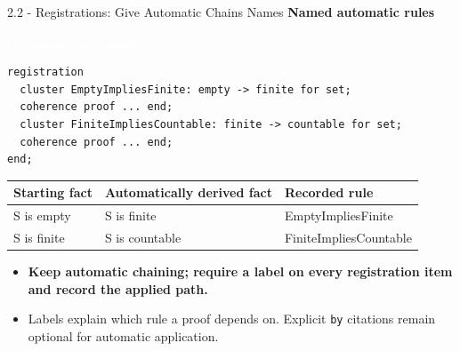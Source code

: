 \documentclass[aspectratio=169,11pt]{beamer}
\newcommand{\statusbadge}[2]{\colorbox{#1}{\textcolor{white}{\strut\scriptsize\sffamily\bfseries #2}}}
\newcommand{\badgeSpec}{\statusbadge{green!35!black}{specification example}}
\begin{document}
\begin{frame}[fragile,t]{2.2 - Registrations: Give Automatic Chains Names}
\smallskip
\textbf{Named automatic rules}~\badgeSpec
\begin{lstlisting}[language={mizar},basicstyle=\ttfamily\small]
registration
  cluster EmptyImpliesFinite: empty -> finite for set;
  coherence proof ... end;
  cluster FiniteImpliesCountable: finite -> countable for set;
  coherence proof ... end;
end;
\end{lstlisting}
\begin{footnotesize}
\setlength{\tabcolsep}{3pt}
\renewcommand{\arraystretch}{1.15}
\begin{tabularx}{\textwidth}{>{\raggedright\arraybackslash}X>{\raggedright\arraybackslash}X>{\raggedright\arraybackslash}X}
\toprule
\textbf{Starting fact} & \textbf{Automatically derived fact} & \textbf{Recorded rule} \\
\midrule
S is empty & S is finite & EmptyImpliesFinite \\
S is finite & S is countable & FiniteImpliesCountable \\
\bottomrule
\end{tabularx}
\end{footnotesize}

\begin{itemize}
\setlength{\itemsep}{1pt}
\setlength{\parsep}{0pt}
\setlength{\parskip}{0pt}
\item \textcolor{blue!55!black}{\textbf{Keep automatic chaining; require a label on every registration item and record the applied path.}}
\item Labels explain which rule a proof depends on. Explicit \texttt{by} citations remain optional for automatic application.
\end{itemize}
\end{frame}
\end{document}
